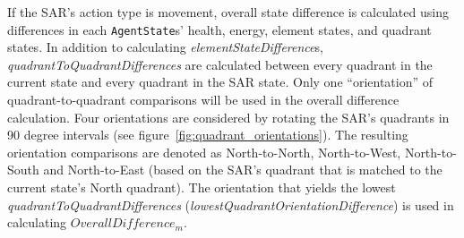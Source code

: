 

If the SAR's action type is movement, overall state difference is calculated using differences in each \texttt{AgentState}s' health, energy, element states, and quadrant states.
In addition to calculating \textit{elementStateDifference}s, \textit{quadrantToQuadrantDifferences} are calculated between every quadrant in the current state and every quadrant in the SAR state.
Only one ``orientation'' of quadrant-to-quadrant comparisons will be used in the overall difference calculation.
Four orientations are considered by rotating the SAR's quadrants in 90 degree intervals (see figure~\ref{fig:quadrant_orientations}).
The resulting orientation comparisons are denoted as North-to-North, North-to-West, North-to-South and North-to-East (based on the SAR's quadrant that is matched to the current state's North quadrant).
The orientation that yields the lowest \textit{quadrantToQuadrantDifferences} (\textit{lowestQuadrantOrientationDifference}) is used in calculating $OverallDifference_{m}$.

